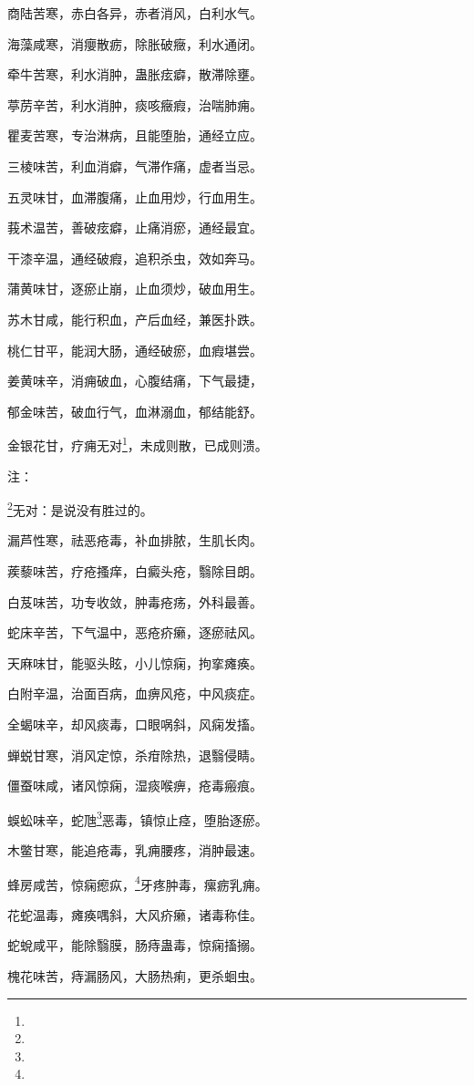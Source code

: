 \documentclass[a4paper,12pt,UTF8,twoside]{ctexbook}
\begin{document}
商陆苦寒，赤白各异，赤者消风，白利水气。

海藻咸寒，消癭散疬，除胀破癥，利水通闭。

牵牛苦寒，利水消肿，蛊胀痃癖，散滞除壅。

葶苈辛苦，利水消肿，痰咳癥瘕，治喘肺痈。

瞿麦苦寒，专治淋病，且能堕胎，通经立应。

三棱味苦，利血消癖，气滞作痛，虚者当忌。

五灵味甘，血滞腹痛，止血用炒，行血用生。

莪术温苦，善破痃癖，止痛消瘀，通经最宜。

干漆辛温，通经破瘕，追积杀虫，效如奔马。

蒲黄味甘，逐瘀止崩，止血须炒，破血用生。

苏木甘咸，能行积血，产后血经，兼医扑跌。

桃仁甘平，能润大肠，通经破瘀，血瘕堪尝。

姜黄味辛，消痈破血，心腹结痛，下气最捷，

郁金味苦，破血行气，血淋溺血，郁结能舒。

金银花甘，疗痈无对\footnote{}，未成则散，已成则溃。

注：

\footnote{}无对：是说没有胜过的。

漏芦性寒，祛恶疮毒，补血排脓，生肌长肉。

蒺藜味苦，疗疮搔痒，白癜头疮，翳除目朗。

白芨味苦，功专收敛，肿毒疮疡，外科最善。

蛇床辛苦，下气温中，恶疮疥癞，逐瘀祛风。

天麻味甘，能驱头眩，小儿惊痫，拘挛瘫痪。

白附辛温，治面百病，血痹风疮，中风痰症。

全蝎味辛，却风痰毒，口眼㖞斜，风痫发搐。

蝉蜕甘寒，消风定惊，杀疳除热，退翳侵睛。

僵蚕味咸，诸风惊痫，湿痰喉痹，疮毒瘢痕。

蜈蚣味辛，蛇虺\footnote{}恶毒，镇惊止痉，堕胎逐瘀。

木鳖甘寒，能追疮毒，乳痈腰疼，消肿最速。

蜂房咸苦，惊痫瘛疭，\footnote{}牙疼肿毒，瘰疬乳痈。

花蛇温毒，瘫痪喁斜，大风疥癞，诸毒称佳。

蛇蛻咸平，能除翳膜，肠痔蛊毒，惊痫搐搦。

槐花味苦，痔漏肠风，大肠热痢，更杀蛔虫。
\end{document}
